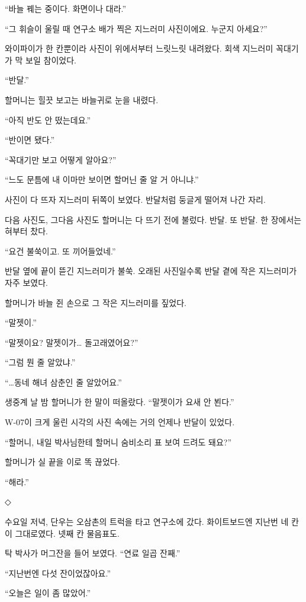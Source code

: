 \documentclass[
  korean,
  letterpaper,
  twoside,
  open=any,
  fontsize=12.5pt,
  headings=small]{scrbook}
\begin{document}
``바늘 꿰는 중이다. 화면이나
대라.''

``그 휘슬이 울릴 때 연구소
배가 찍은 지느러미 사진이에요.
누군지 아세요?''

와이파이가 한 칸뿐이라 사진이
위에서부터 느릿느릿 내려왔다.
회색 지느러미 꼭대기가 막 보일
참이었다.

``반달.''

할머니는 힐끗 보고는 바늘귀로
눈을 내렸다.

``아직 반도 안 떴는데요.''

``반이면 됐다.''

``꼭대기만 보고 어떻게
알아요?''

``느도 문틈에 내 이마만 보이면
할머닌 줄 알 거 아니냐.''

사진이 다 뜨자 지느러미 뒤쪽이
보였다. 반달처럼 둥글게 떨어져
나간 자리.

다음 사진도, 그다음 사진도
할머니는 다 뜨기 전에 불렀다.
반달. 또 반달. 한 장에서는
혀부터 찼다.

``요건 불쑥이고. 또
끼어들었네.''

반달 옆에 끝이 뜯긴 지느러미가
불쑥. 오래된 사진일수록 반달
곁에 작은 지느러미가 자주
보였다.

할머니가 바늘 쥔 손으로 그
작은 지느러미를 짚었다.

``말젯이.''

``말젯이요? 말젯이가\ldots{}
돌고래였어요?''

``그럼 뭔 줄 알았냐.''

``\ldots 동네 해녀 삼춘인 줄
알았어요.''

생중계 날 밤 할머니가 한 말이
떠올랐다. ``말젯이가 요새 안
뵌다.''

W-07이 크게 울린 시각의 사진
속에는 거의 언제나 반달이
있었다.

``할머니, 내일 박사님한테
할머니 숨비소리 표 보여 드려도
돼요?''

할머니가 실 끝을 이로 똑
끊었다.

``해라.''

\begin{center}◇\end{center}\nopagebreak

수요일 저녁, 단우는 오삼촌의
트럭을 타고 연구소에 갔다.
화이트보드엔 지난번 네 칸이
그대로였다. 넷째 칸 물음표도.

탁 박사가 머그잔을 들어
보였다. ``연료 일곱 잔째.''

``지난번엔 다섯
잔이었잖아요.''

``오늘은 일이 좀 많았어.''
\end{document}
